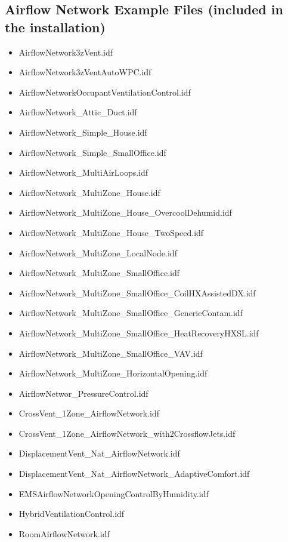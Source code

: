\subsection{Airflow Network Example Files (included in the installation)}\label{airflow-network-example-files-included-in-the-installation}

\begin{itemize}
\item
  AirflowNetwork3zVent.idf
\item
  AirflowNetwork3zVentAutoWPC.idf
\item
  AirflowNetworkOccupantVentilationControl.idf
\item
  AirflowNetwork\_Attic\_Duct.idf
\item
  AirflowNetwork\_Simple\_House.idf
\item
  AirflowNetwork\_Simple\_SmallOffice.idf
\item
  AirflowNetwork\_MultiAirLoops.idf
\item
  AirflowNetwork\_MultiZone\_House.idf
\item
  AirflowNetwork\_MultiZone\_House\_OvercoolDehumid.idf
\item
  AirflowNetwork\_MultiZone\_House\_TwoSpeed.idf
\item
  AirflowNetwork\_MultiZone\_LocalNode.idf
\item
  AirflowNetwork\_MultiZone\_SmallOffice.idf
\item
  AirflowNetwork\_MultiZone\_SmallOffice\_CoilHXAssistedDX.idf
\item
  AirflowNetwork\_MultiZone\_SmallOffice\_GenericContam.idf
\item
  AirflowNetwork\_MultiZone\_SmallOffice\_HeatRecoveryHXSL.idf
\item
  AirflowNetwork\_MultiZone\_SmallOffice\_VAV.idf
\item
  AirflowNetwork\_MultiZone\_HorizontalOpening.idf
\item
  AirflowNetwor\_PressureControl.idf
\item
  CrossVent\_1Zone\_AirflowNetwork.idf
\item
  CrossVent\_1Zone\_AirflowNetwork\_with2CrossflowJets.idf
\item
  DisplacementVent\_Nat\_AirflowNetwork.idf
\item
  DisplacementVent\_Nat\_AirflowNetwork\_AdaptiveComfort.idf
\item
  EMSAirflowNetworkOpeningControlByHumidity.idf
\item
  HybridVentilationControl.idf
\item
  RoomAirflowNetwork.idf
\end{itemize}

